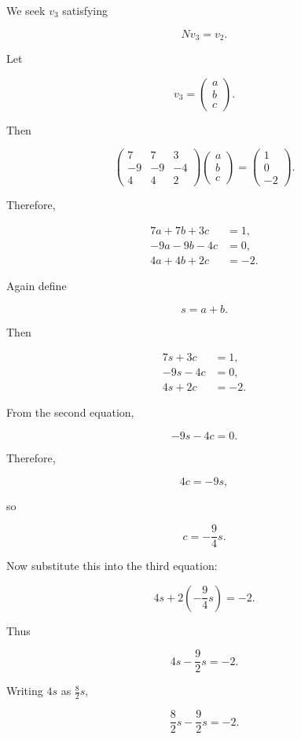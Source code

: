 \documentclass[11pt]{article}
\begin{document}
We seek \(v_3\) satisfying

\[
\boxed{
Nv_3=v_2.
}
\]

Let

\[
v_3=
\begin{pmatrix}
a\\
b\\
c
\end{pmatrix}.
\]

Then

\[
\begin{pmatrix}
7&7&3\\
-9&-9&-4\\
4&4&2
\end{pmatrix}
\begin{pmatrix}
a\\
b\\
c
\end{pmatrix}
=
\begin{pmatrix}
1\\
0\\
-2
\end{pmatrix}.
\]

Therefore,

\[
\begin{aligned}
7a+7b+3c&=1,\\
-9a-9b-4c&=0,\\
4a+4b+2c&=-2.
\end{aligned}
\]

Again define

\[
s=a+b.
\]

Then

\[
\begin{aligned}
7s+3c&=1,\\
-9s-4c&=0,\\
4s+2c&=-2.
\end{aligned}
\]

From the second equation,

\[
-9s-4c=0.
\]

Therefore,

\[
4c=-9s,
\]

so

\[
c=-\frac{9}{4}s.
\]

Now substitute this into the third equation:

\[
4s+2\left(-\frac94s\right)=-2.
\]

Thus

\[
4s-\frac92s=-2.
\]

Writing \(4s\) as \(\frac82s\),

\[
\frac82s-\frac92s=-2.
\]
\end{document}
